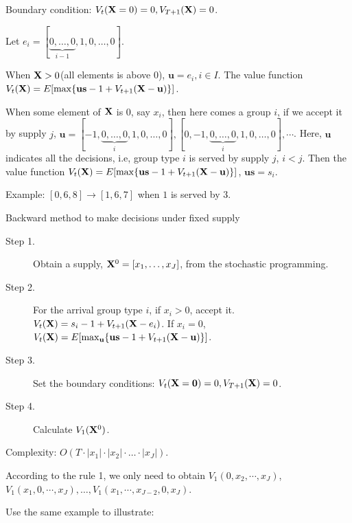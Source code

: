 Boundary condition: $V_{t}(\mathbf{X}=0) =0, V_{T+1}(\mathbf{X}) =0$.
 
Let $e_{i} = [\underbrace{0, \ldots, 0}_{i-1},1,0, \ldots, 0]$.

When $\mathbf{X} > 0$(all elements is above 0), $\mathbf{u} = e_i, i \in I$. The value function $V_{t}(\mathbf{X}) = E[\max\{\mathbf{u} \mathbf{s} -1 + V_{t+1}(\mathbf{X}- \mathbf{u})\}]$.

When some element of $\mathbf{X}$ is 0, say $x_{i}$, then here comes a group $i$, if we accept it by supply $j$, $\mathbf{u} = [-1, \underbrace{0,\ldots,0}_{i}, 1,0,\ldots,0], [0, -1, \underbrace{0,\ldots,0}_{i}, 1,0,\ldots,0], \cdots$. Here, $\mathbf{u}$ indicates all the decisions, i.e, group type $i$ is served by supply $j$, $i<j$. Then the value function $V_{t}(\mathbf{X}) = E[\max\{\mathbf{u} \mathbf{s} -1 + V_{t+1}(\mathbf{X}- \mathbf{u})\}]$, $\mathbf{u} \mathbf{s}  = s_i$.

Example: $[0,6,8] \to [1,6,7]$ when $1$ is served by $3$.

\begin{algorithm}[H]\label{DP_based}
  \caption{Backward method to make decisions under fixed supply}
  \begin{description}
    \item[Step 1.] Obtain a supply, $\mathbf{X}^{0} = [x_1,\ldots,x_{J}]$, from the stochastic programming.
    \item[Step 2.] For the arrival group type $i$, if $x_{i} > 0$, accept it. $V_{t}(\mathbf{X}) = s_{i}-1 + V_{t+1}(\mathbf{X}- e_i)$. If $x_{i} = 0$, $V_{t}(\mathbf{X}) = E[\max_{\mathbf{u}}\{\mathbf{u} \mathbf{s} -1 + V_{t+1}(\mathbf{X}- \mathbf{u})\}]$.
    \item[Step 3.] Set the boundary conditions: $V_{t}(\mathbf{X}= \mathbf{0}) =0, V_{T+1}(\mathbf{X}) =0$.
    \item[Step 4.] Calculate $V_{1}(\mathbf{X}^{0})$.
  \end{description}
\end{algorithm}

Complexity: $O(T \cdot |x_1| \cdot |x_2| \cdot \ldots \cdot |x_{J}|)$.

According to the rule 1, we only need to obtain $V_{1}(0, x_{2}, \cdots, x_{J})$, $V_{1}(x_{1}, 0, \cdots, x_{J}),\ldots, V_{1}(x_{1}, \cdots, x_{J-2},0, x_{J})$.

Use the same example to illustrate:


